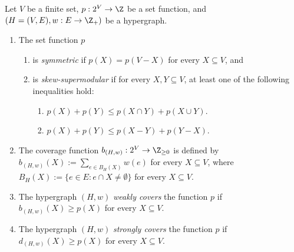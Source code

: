 \begin{definition}
    Let $V$ be a finite set, $p: 2^V\rightarrow \Z$ be a set function,  and $(H=(V, E), w:E\rightarrow \Z_+)$ be a hypergraph. 
\begin{enumerate}
    \item The set function $p$
    \begin{enumerate}
    \item is \emph{symmetric} if $p(X)=p(V-X)$ for every $X\subseteq V$, and 
    \item is \emph{skew-supermodular} if for every $X, Y\subseteq V$, at least one of the following inequalities hold: 
    \begin{enumerate}
    \item $p(X) + p(Y) \leq p(X\cap Y) + p(X\cup Y)$. %
    \item $p(X) + p(Y) \leq p(X - Y) + p(Y - X)$. %
\end{enumerate}
\end{enumerate}
    \item The coverage function $b_{(H, w)}:2^V\rightarrow \Z_{\ge 0}$ is defined by $b_{(H,w)}(X):=\sum_{e\in B_H(X)}w(e)$ for every $X\subseteq V$, where $B_H(X):=\{e\in E: e\cap X\neq \emptyset\}$ for every $X\subseteq V$. 
    \item The hypergraph $(H, w)$ \emph{weakly covers} the function $p$ if $b_{(H, w)}(X)\ge p(X)$ for every $X\subseteq V$. 
    \item The hypergraph $(H, w)$ \emph{strongly covers} the function $p$ if $d_{(H, w)}(X)\ge p(X)$ for every $X\subseteq V$. 
\end{enumerate}
\end{definition}

